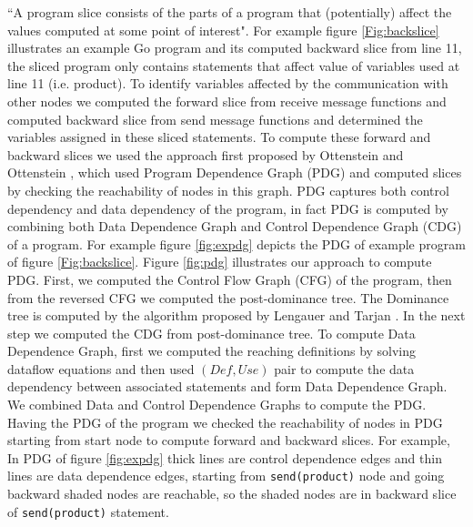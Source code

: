 ``A program slice consists of the parts of a program that (potentially) affect the values computed at some point of interest"\cite{Tip}. For example figure \ref{Fig:backslice} illustrates an example Go program and its computed backward slice from line 11, the sliced program only contains statements that affect value of variables used at line 11 (i.e. product). To identify variables affected by the communication with other nodes we computed the forward slice from receive message functions and computed backward slice from send message functions and determined the variables assigned in these sliced statements. To compute these forward and backward slices we used the approach first proposed by Ottenstein and Ottenstein \cite{PDG}, which used Program Dependence Graph (PDG) and computed slices by checking the reachability of nodes in this graph. PDG captures both control dependency and data dependency of the program, in fact PDG is computed by combining both Data Dependence Graph and Control Dependence Graph (CDG) of a program. For example figure \ref{fig:expdg} depicts the PDG of example program of figure \ref{Fig:backslice}. Figure \ref{fig:pdg} illustrates our approach to compute PDG. First, we computed the Control Flow Graph (CFG) of the program, then from the reversed CFG we computed the post-dominance tree. The Dominance tree is computed by the algorithm proposed by Lengauer and Tarjan \cite{Dom}. In the next step we computed the CDG from post-dominance tree. To compute Data Dependence Graph, first we computed the reaching definitions by solving dataflow equations\cite{dragonbook} and then used $(Def,Use)$ pair to compute the data dependency between associated statements and form Data Dependence Graph. We combined Data and Control Dependence Graphs to compute the PDG. Having the PDG of the program we checked the reachability of nodes in PDG starting from start node to compute forward and backward slices. For example, In PDG of figure \ref{fig:expdg} thick lines are control dependence edges and thin lines are data dependence edges, starting from \texttt{send(product)} node and going backward shaded nodes are reachable, so the shaded nodes are in backward slice of \texttt{send(product)} statement.


